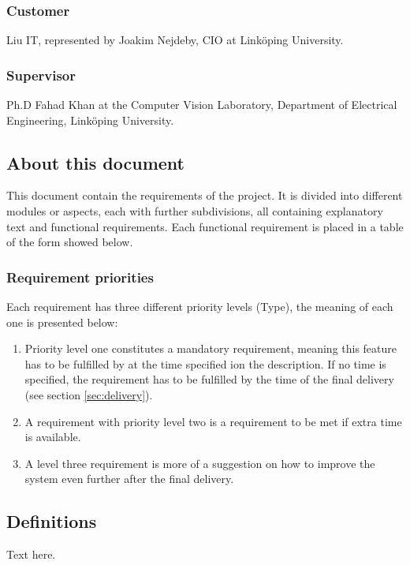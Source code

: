 \subsubsection{Customer}
Liu IT, represented by Joakim Nejdeby, CIO at Linköping University.

\subsubsection{Supervisor}
Ph.D Fahad Khan at the Computer Vision Laboratory, Department of Electrical Engineering, Linköping University.

\subsection{About this document}
This document contain the requirements of the project. It is divided into different modules or aspects, each with further subdivisions, all containing explanatory text and functional requirements. Each functional requirement is placed in a table of the form showed below.

\reqtable
{
	
}
\subsubsection{Requirement priorities}
Each requirement has three different priority levels (Type), the meaning of each one is presented below:

\begin{enumerate}
	\item Priority level one constitutes a mandatory requirement, meaning this feature has to be fulfilled by at the time specified ion the description. If no time is specified, the requirement has to be fulfilled by the time of the final delivery (see section \ref{sec:delivery}). %
	\item A requirement with priority level two is a requirement to be met if extra time is available.
	\item A level three requirement is more of a suggestion on how to improve the system even further after the final delivery.
\end{enumerate}


\subsection{Definitions}
Text here.

